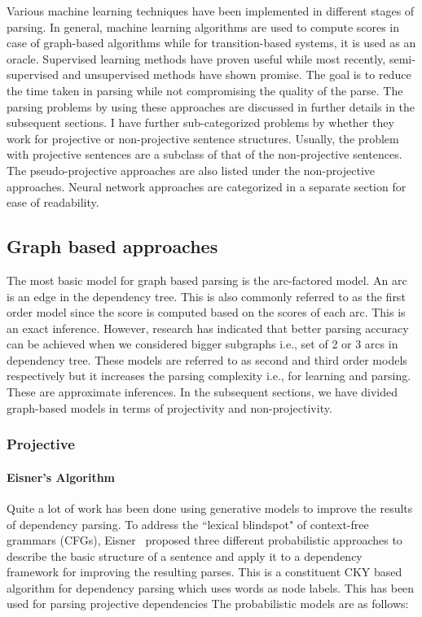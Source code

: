 Various machine learning techniques have been implemented in different stages of parsing. In general, machine learning algorithms are used to compute scores in case of graph-based algorithms while for transition-based systems, it is used as an oracle. Supervised learning methods have proven useful while most recently, semi-supervised and unsupervised methods have shown promise. The goal is to reduce the time taken in parsing while not compromising the quality of the parse. 
The parsing problems by using these approaches are discussed in further details in the subsequent sections. I have further sub-categorized problems by whether they work for projective or non-projective sentence structures. Usually, the problem with projective sentences are a subclass of that of the non-projective sentences. The pseudo-projective approaches are also listed under the non-projective approaches. Neural network approaches are categorized in a separate section for ease of readability.

\subsection{Graph based approaches}

The most basic model for graph based parsing is the arc-factored model. An arc is an edge in the dependency tree. This is also commonly referred to as the first order model since the score is computed based on the scores of each arc. This is an exact inference. However, research has indicated that better parsing accuracy can be achieved when we considered bigger subgraphs i.e., set of 2 or 3 arcs in dependency tree. These models are referred to as second and third order models respectively but it increases the parsing complexity i.e., for learning and parsing. These are approximate inferences. In the subsequent sections, we have divided graph-based models in terms of projectivity and non-projectivity. 


\subsubsection{Projective}

\paragraph*{Eisner's Algorithm}
Quite a lot of work has been done using generative models to improve the results of dependency parsing. To address the ``lexical blindspot" of context-free grammars (CFGs), Eisner~\cite{eisner1996three} proposed three different probabilistic approaches to describe the basic structure of a sentence and apply it to a dependency framework for improving the resulting parses. This is a constituent CKY based algorithm for dependency parsing which uses words as node labels. This has been used for parsing projective dependencies The probabilistic models are as follows:

